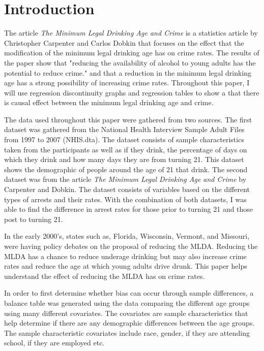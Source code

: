 \documentclass[a4paper]{article}
\begin{document}
\section{Introduction}
The article \textit{The Minimum Legal Drinking Age and Crime} is a statistics article by Christopher Carpenter and Carlos Dobkin that focuses on the effect that the modification of the minimum legal drinking age has on crime rates. The results of the paper show that "reducing the availability of alcohol to young adults has the potential to reduce crime." and that a reduction in the minimum legal drinking age has a strong possibility of increasing crime rates. Throughout this paper, I will use regression discontinuity graphs and regression tables to show a that there is causal effect between the minimum legal drinking age and crime. 
\par
The data used throughout this paper were gathered from two sources. The first dataset was gathered from the National Health Interview Sample Adult Files from 1997 to 2007 (NHIS.dta). The dataset consists of sample characteristics taken from the participants as well as if they drink, the percentage of days on which they drink and how many days they are from turning 21. This dataset shows the demographic of people around the age of 21 that drink. The second dataset was from the article \textit{The Minimum Legal Drinking Age and Crime} by Carpenter and Dobkin. The dataset consists of variables based on the different types of arrests and their rates. With the combination of both datasets, I was able to find the difference in arrest rates for those prior to turning 21 and those post to turning 21. 
\par
In the early 2000's, states such as, Florida, Wisconsin, Vermont, and Missouri, were having policy debates on the proposal of reducing the MLDA. Reducing the MLDA has a chance to reduce underage drinking but may also increase crime rates and reduce the age at which young adults drive drunk. This paper helps understand the effect of reducing the MLDA has on crime rates. 
\par
In order to first determine whether bias can occur through sample differences, a balance table was generated using the data comparing the different age groups using many different covariates. The covariates are sample characteristics that help determine if there are any demographic differences between the age groups. The sample characteristic covariates include race, gender, if they are attending school, if they are employed etc.
\par
\end{document}
